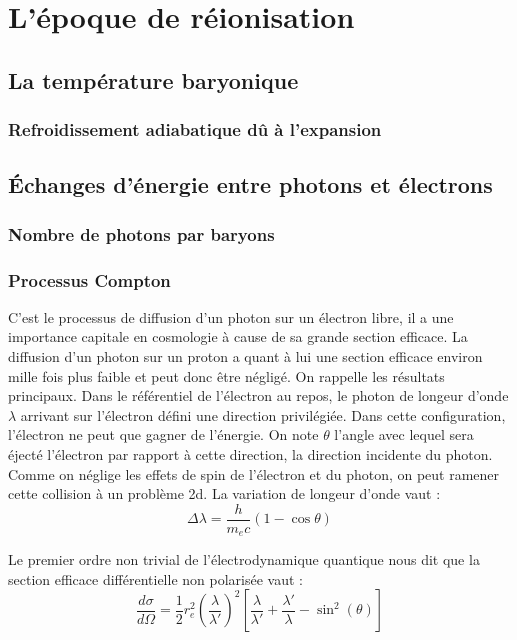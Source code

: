 \documentclass[10pt, a4paper]{report}
\numberwithin{equation}{subsection}
\begin{document}
\chapter{L'époque de réionisation}
\section{La température baryonique}
\subsection{Refroidissement adiabatique dû à l'expansion}
\section{\uppercase{é}changes d'énergie entre photons et électrons}
\subsection{Nombre de photons par baryons}

\subsection{Processus Compton}
C'est le processus de diffusion d'un photon sur un électron libre, il a une importance capitale en cosmologie à cause de sa grande section efficace. La diffusion d'un photon sur un proton a quant à lui une section efficace environ mille fois plus faible et peut donc être négligé. On rappelle les résultats principaux. Dans le référentiel de l'électron au repos, le photon de longeur d'onde $\lambda$ arrivant sur l'électron défini une direction privilégiée. Dans cette configuration, l'électron ne peut que gagner de l'énergie. On note $\theta$ l'angle avec lequel sera éjecté l'électron par rapport à cette direction, la direction incidente du photon. Comme on néglige les effets de spin de l'électron et du photon, on peut ramener cette collision à un problème 2d.
La variation de longeur d'onde vaut :
\begin{equation} \label{eq:VLO}
\boxed{\Delta\lambda=\frac{h}{m_e c}(1 - \cos \theta)}
\end{equation}

 Le premier ordre non trivial de l'électrodynamique quantique nous dit que la section efficace différentielle non polarisée vaut :
\begin{equation} \label{eq:QED}
\boxed{\frac{d\sigma}{d\Omega} = \frac{1}{2} r_e^2 \left(\frac{\lambda}{\lambda'}\right)^{2} \left[\frac{\lambda}{\lambda'} + \frac{\lambda'}{\lambda} - \sin^2(\theta)\right]}
\end{equation}
\end{document}
